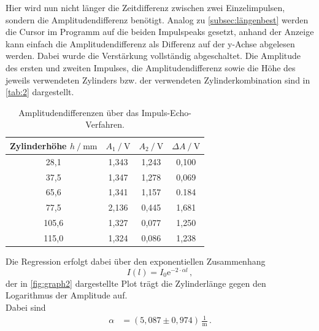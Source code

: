 Hier wird nun nicht länger die Zeitdifferenz zwischen zwei Einzelimpulsen, sondern die Amplitudendifferenz benötigt.
Analog zu \autoref{subsec:längenbest} werden die Cursor im Programm auf die beiden Impulspeaks gesetzt, anhand der Anzeige kann einfach die Amplitudendifferenz
als Differenz auf der y-Achse abgelesen werden.
Dabei wurde die Verstärkung vollständig abgeschaltet.
Die Amplitude des ersten und zweiten Impulses, die Amplitudendifferenz sowie die Höhe des jeweils verwendeten Zylinders bzw. 
der verwendeten Zylinderkombination sind in \autoref{tab:2}
dargestellt.

\begin{table}
    \centering
    \caption{Amplitudendifferenzen über das Impuls-Echo-Verfahren.}
    \label{tab:2} 
    \begin{tabular}{c c c c}
    \toprule 
    {Zylinderhöhe $h \mathbin{/} \unit{\milli\meter}$} & {$A_1 \mathbin{/} \unit{\volt}$} & {$A_2 \mathbin{/} \unit{\volt}$} & {$\Delta A \mathbin{/} \unit{\volt}$}\\
    \midrule 
     28,1       &       1,343       &        1,243      &       0,100       \\       
     37,5       &       1,347       &        1,278      &       0,069       \\       
     65,6       &       1,341       &        1,157      &       0.184       \\       
     77,5       &       2,136       &        0,445      &       1,681       \\       
    105,6       &       1,327       &        0,077      &       1,250       \\
    115,0       &       1,324       &        0,086      &       1,238       \\               
    \bottomrule
    \end{tabular}  
\end{table}

Die Regression erfolgt dabei über den exponentiellen Zusammenhang
\begin{equation*}
    I(l) = I_0 \text{e}^{-2 \cdot \alpha l} \,,
\end{equation*}
der in \autoref{fig:graph2} dargestellte Plot trägt die Zylinderlänge gegen den Logarithmus der Amplitude auf. \\
Dabei sind
\begin{align*}
    \alpha  &= (5,087 \pm 0,974) \,\frac{1}{\unit{\meter}} \,.
\end{align*}

